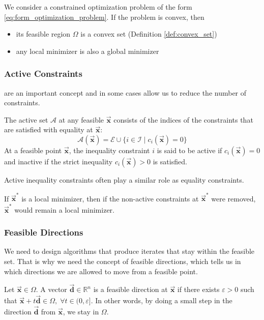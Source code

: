 \documentclass[9pt, headings=standardclasses, parskip=half]{scrartcl}
\renewcommand{\emph}[1]{\textcolor{mypurple}{#1}}
\newcommand{\vect}[1]{\vec{\boldsymbol{#1}}}
\newcommand{\R}{\mathbb{R}}
\begin{document}
\begin{lemma}\label{lem:properties_convex_problem}
  We consider a constrained optimization problem of the form \eqref{eq:form_optimization_problem}. 
  If the problem is convex, then
  \begin{itemize}
    \item its feasible region \(\Omega\) is a convex set (Definition \ref{def:convex_set})
    \item any local minimizer is also a global minimizer \qedhere
 \end{itemize}
\end{lemma}

\subsubsection{Active Constraints}\label{sec:active_constraints}
are an important concept and in some cases allow us to reduce the number of constraints.

\begin{definition}\label{def:active_set}
  The active set \(\mathcal{A}\) at any feasible \(\vect{x}\) consists of the indices of the constraints that are satisfied with equality at \(\vect{x}\):
  \[
  \mathcal{A}(\vect{x}) = \mathcal{E} \cup \{i \in \mathcal{I} \mid c_i(\vect{x}) = 0\}%
  \]
  At a feasible point \(\vect{x}\), the inequality constraint \(i\) is said to be \emph{active} if \(c_i(\vect{x}) = 0\) and \emph{inactive} if the strict inequality \(c_i(\vect{x}) > 0\) is satisfied.
\end{definition}
Active inequality constraints often play a similar role as equality constraints.

If \(\vect{x}^{\ast}\) is a local minimizer, then if the non-active constraints at \(\vect{x}^{\ast}\) were removed, \(\vect{x}^{\ast}\) would remain a local minimizer.



\subsubsection{Feasible Directions}
We need to design algorithms that produce iterates that stay within the feasible set.
That is why we need the concept of \emph{feasible directions}, which tells us in which directions we are allowed to move from a feasible point.
\begin{definition}\label{def:feasible_direction}
  Let \(\vect{x}\in\Omega\). A vector \(\vect{d}\in\R^{n}\) is a \emph{feasible direction} at \(\vect{x}\) if there exists \(\varepsilon>0\) such that \(\vect{x}+t\vect{d}\in\Omega,\; \forall t\in(0,\varepsilon]\).
  In other words, by doing a small step in the direction \(\vect{d}\) from \(\vect{x}\), we stay in \(\Omega\).
\end{definition}
\end{document}
